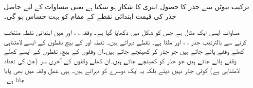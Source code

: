 ترکیب نیوٹن سے جذر کا حصول ابتری کا شکار ہو سکتا ہے یعنی  مساوات کے لیے حاصل جذر کی قیمت ابتدائی نقطے کے  مقام  کو بہت حساس ہو گی۔

مساوات  ایسی ایک مثال ہے جس کو شکل  میں دکھایا گیا ہے۔ وقفہ
 ، ،  اور  میں ابتدائی نقطہ منتخب کرنے سے بالترتیب جذر ، ، اور  ملتا ہے۔
 نقطے      دہراتے ہیں۔ نقطہ  اور  کے بیچ نقطوں کے ایسے لامتناہی کھلے وقفے پائے جاتے ہیں جو جذر  کو کھینچے جاتے ہیں۔ان وقفوں کے بیچ، نقطوں کے ایسے کھلے وقفے پائے جاتے ہیں جو جذر  کو کھینچے جاتے ہیں۔ان کھلے وقفوں کے آخری سر (جن کی تعداد لامتناہی ہے) کوئی جذر نہیں دیتے  بلکہ یہ ایک دوسرے کو دہراتے ہیں۔ یہی عمل وقفہ  میں بھی پایا جاتا ہے۔
 
